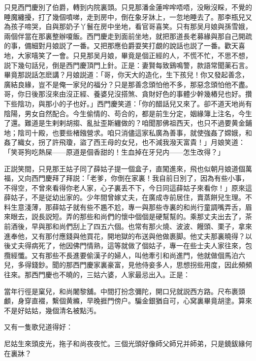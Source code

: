 只見西門慶別了伯爵，轉到内院裏頭。只見那潘金蓮哰哰唔唔，没瞅沒睬，不覺的睡魔纏擾，打了幾個噴㖒，走到房中，倒在象牙牀上，一忽地睡去了。那李瓶兒又為孩子啼哭，自與那奶子丫鬟在房中坐地，看官哥喜笑。只有那吴月娘與孫雪娥，兩個伴當在那裏整辦嗄飯。西門慶走到面前坐地，就把那道長老募緣與那自己開疏的事，備細對月娘説了一番。又把那應伯爵耍笑打覷的說話也説了一番。歡天喜地，大家嘻笑了一會。只見那吴月娘，畢竟是個正經的人，不慌不忙，不思不想，説下幾句話兒，倒是西門慶頂門上針。正是：妻賢每致鷄鳴警，款語常聞薬石言。畢竟那説話怎麽講？月娘説道：「哥，你天大的造化，生下孩兒！你又發起善念，廣結良緣，豈不是俺一家兒的福分？只是那善念頭怕他不多，那惡念頭怕他不盡。哥，你日後那沒來由沒正經、養婆兒沒搭煞、貪財好色的事體少幹幾樁兒也好。攢下些陰功，與那小的子也好。」西門慶笑道：「你的醋話兒又來了。卻不道天地尚有陰陽，男女自然配合。今生偷情的、苟合的，都是前生分定，姻緣簿上注名，今生了還。難道是生剌剌胡搊、亂扯歪斯纏做的？咱聞那佛祖西天，也只不過要黄金鋪地；陰司十殿，也要些楮鏹營求。咱只消儘這家私廣為善事，就使強姦了嫦娥，和姦了織女，拐了許飛瓊，盜了西王母的女兒，也不減我潑天富貴！」月娘笑道：「笑哥狗吃熱屎——原道是個香甜的！生血掉在牙兒内——怎生改得？」

正説笑間，只見那王姑子同了薛姑子提一個盒子，直闖進來，飛也似朝月娘道個萬福，又向西門慶拜了拜説：「老爹，你倒在家裏！我自前日別了，因為有些小事，不得空，不曾來看得你老人家，心子裏丢不下，今日同這薛姑子來看你！」原來這薛姑子，不是従幼出家的。少年間曾嫁丈夫，在廣成寺前居住，賣蒸餅兒生理。不料生意淺薄，那薛姑子就有些不尷不尬，專一與那些寺裏的和尚行童調嘴弄舌，眉來眼去，説長説短。弄的那些和尚們的懷中個個是硬幫幫的。乘那丈夫出去了，茶前酒後，早與那和尚們刮上了四五六個。也常有那火燒、波波、饅頭、栗子，拿來進奉他，又有那付應錢與他買花，開地獄的布送與他做裹脚。他丈夫那裏曉得？以後丈夫得病死了，他因佛門情熟，這等就做了個姑子，專一在些士夫人家往來，包攬經懺。又有那些不長進要偷漢子的婦人，叫他牽引和尚進門，他就做個馬泊六兒，多得錢鈔。聞的那西門慶家裏豪富，見他侍妾多人，思想拐些用度，因此頻頻往來。那西門慶也不曉的，三姑六婆，人家最忌出入。正是：

當年行徑是窠兒，和尚闍黎舖。中間打扮念彌陀，開口兒就説西方路。尺布裹頭顱，身穿直裰，繫個黄縧，早晚捱門傍户。騙金銀猶自可，心窝裏畢竟胡塗。算來不是好姑姑，幾個清名被點汚。

又有一隻歌兒道得好：

尼姑生來頭皮光，拖子和尚夜夜忙。三個光頭好像師父師兄并師弟，只是鐃鈸緣何在裏牀？

